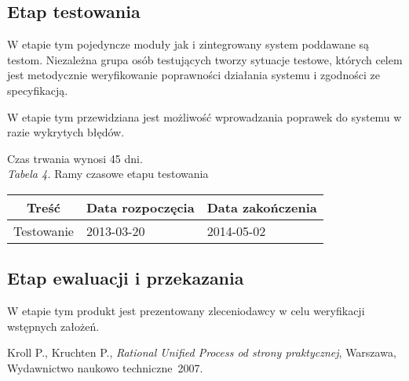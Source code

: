 \documentclass [11pt, a4paper, leqno]	{article}	%
\begin{document}
\subsection{Etap testowania}
\noindent
W etapie tym pojedyncze moduły jak i zintegrowany system poddawane są testom. Niezależna grupa osób testujących tworzy sytuacje testowe, których celem jest metodycznie weryfikowanie poprawności działania systemu i zgodności ze specyfikacją.

W etapie tym przewidziana jest możliwość wprowadzania poprawek do systemu w razie wykrytych błędów. 

Czas trwania wynosi 45 dni. \\

\textit{Tabela 4.} Ramy czasowe etapu testowania

\begin{center}
	\begin{tabular}{| l | l | l |}
		\hline
		\multicolumn{1}{|c|}{Treść} & 
		\multicolumn{1}{|c|}{Data rozpoczęcia} & 
		\multicolumn{1}{|c|}{Data zakończenia} \\ \hline \hline
		Testowanie & 2013-03-20 & 2014-05-02 \\ \hline
	\end{tabular}
\end{center}

\subsection{Etap ewaluacji i przekazania}
\noindent
W etapie tym produkt jest prezentowany zleceniodawcy w celu weryfikacji wstępnych założeń. 

\newpage

\begin{thebibliography}{2}
	 Kroll P., Kruchten P., \emph{Rational Unified Process od strony praktycznej}, Warszawa, Wydawnictwo naukowo techniczne~2007.
\end{thebibliography}
\end{document}

